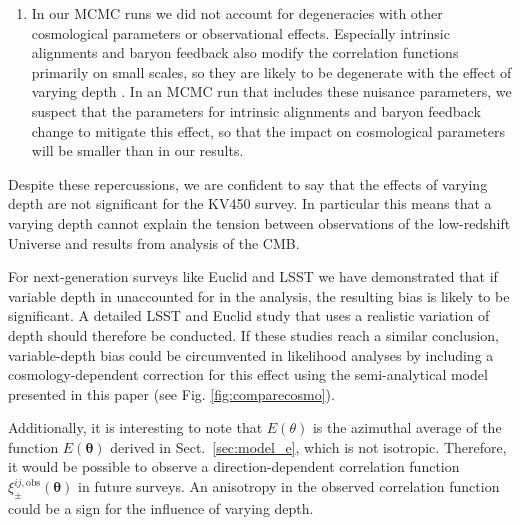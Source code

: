 \documentclass{aa}
\renewcommand{\rm}{\mathrm}
\def\b#1{\bm{#1}}
\begin{document}
\begin{enumerate}
\item In our MCMC runs we did not account for degeneracies with other cosmological parameters or observational effects. Especially intrinsic alignments and baryon feedback also modify the correlation functions primarily on small scales, so they are likely to be degenerate with the effect of varying depth \citep{Troxel:2015}. In an MCMC run that includes these nuisance parameters, we suspect that the parameters for intrinsic alignments and baryon feedback change to mitigate this effect, so that the impact on cosmological parameters will be smaller than in our results. %
\end{enumerate}

Despite these repercussions, we are confident to say that the effects of varying depth are not significant for the KV450 survey. In particular this means that a varying depth cannot explain the tension between observations of the low-redshift Universe and results from analysis of the CMB.

For next-generation surveys like Euclid and LSST we have demonstrated that if variable depth in unaccounted for in the analysis, the resulting bias is likely to be significant. A detailed LSST and Euclid study that uses a realistic variation of depth should therefore be conducted. If these studies reach a similar conclusion, variable-depth bias could be circumvented in likelihood analyses by including a cosmology-dependent correction for this effect using the semi-analytical model presented in this paper (see Fig. \ref{fig:comparecosmo}).

Additionally, it is interesting to note that $E(\theta)$ is the azimuthal average of the function $E(\b\theta)$ derived in Sect.~\ref{sec:model_e}, which is not isotropic. Therefore, it would be possible to observe a direction-dependent correlation function $\xi_\pm^{ij,\rm{obs}}(\b\theta)$ in future surveys. An anisotropy in the observed correlation function could be a sign for the influence of varying depth.
\end{document}
